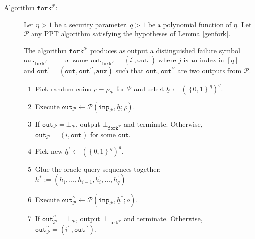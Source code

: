 \documentclass{iacrtrans}
\theoremstyle{definition}
\numberwithin{theorem}{subsection}
\numberwithin{lemma}{theorem}
\begin{document}
\begin{description}
\item [Algorithm $\texttt{fork}^{\mathcal{P}}$:]  Let $\eta > 1$ be a security parameter, $q > 1$ be a polynomial function of $\eta$. Let $\mathcal{P}$ any PPT algorithm satisfying the hypotheses of Lemma \ref{genfork}. %


The algorithm $\texttt{fork}^{\mathcal{P}}$ produces as output a distinguished failure symbol $\texttt{out}_{\texttt{fork}^{\mathcal{P}}} = \bot$ or some $\texttt{out}_{\texttt{fork}^{\mathcal{P}}} = (i^\prime, \texttt{out}^\prime)$ where $j$ is an index in $[q]$ and $\texttt{out}^\prime = (\texttt{out}, \texttt{out}^{\prime\prime}, \texttt{aux})$ such that $\texttt{out}$, $\texttt{out}^{\prime\prime}$ are two outputs from $\mathcal{P}$. \begin{enumerate}
\item Pick random coins $\rho=\rho_\mathcal{P}$ for $\mathcal{P}$ and select $\underline{h} \leftarrow (\left\{0,1\right\}^{\eta})^q$.

\item Execute $\texttt{out}_\mathcal{P} \leftarrow \mathcal{P}(\texttt{inp}_{\mathcal{P}}, \underline{h};  \rho)$.

\item If $\texttt{out}_\mathcal{P} = \bot_\mathcal{P}$, output $\bot_{\texttt{fork}^{\mathcal{P}}}$ and terminate. Otherwise, $\texttt{out}_{\mathcal{P}} = (i, \texttt{out})$ for some $\texttt{out}$.

\item Pick new $\underline{h}^\prime \leftarrow (\left\{0,1\right\}^\eta)^q$.

\item Glue the oracle query sequences together: $\underline{h}^* := (h_1, \ldots, h_{i-1}, h^\prime_i, \ldots, h^\prime_q)$.

\item Execute $\texttt{out}_{\mathcal{P}}^{\prime \prime} \leftarrow \mathcal{P}(\texttt{inp}_{\mathcal{P}}, \underline{h}^*; \rho)$.

\item If $\texttt{out}_{\mathcal{P}}^{\prime \prime} = \bot_\mathcal{P}$, output $\bot_{\texttt{fork}^{\mathcal{P}}}$ and terminate. Otherwise, $\texttt{out}_{\mathcal{P}}^{\prime \prime} = (i^{\prime \prime}, \texttt{out}^{\prime \prime})$. 


\end{enumerate}
\end{description}
\end{document}
